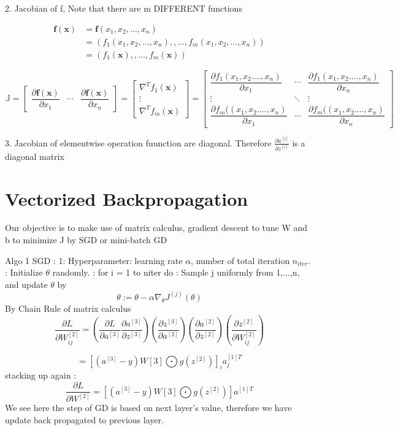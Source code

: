 \documentclass{article}
\begin{document}
2. Jacobian of f, Note that there are m DIFFERENT functions 

$$
\begin{aligned}
\mathbf{f}(\mathbf{x})&=\mathbf{f}(x_1,x_2,\dots,x_n)\\
&=(f_1(x_1,x_2,\dots,x_n),,\dots,f_m(x_1,x_2,\dots,x_n))\\
&=(f_1(\mathbf{x}),,\dots,f_m(\mathbf{x}))
\end{aligned}
$$

$$
\mathbb{J}=\left[\begin{array}{ccc}
\dfrac{\partial \mathbf{f}(\mathbf{x})}{\partial x_{1}} & \cdots & \dfrac{\partial \mathbf{f}(\mathbf{x})}{\partial x_{n}}
\end{array}\right]=\left[\begin{array}{c}
\nabla^{T} f_{1}(\mathbf{x}) \\
\vdots \\
\nabla^{T} f_{m}(\mathbf{x})
\end{array}\right]=\left[\begin{array}{ccc}
\dfrac{\partial f_{1}(x_1,x_2....,x_n)}{\partial x_{1}} & \cdots & \dfrac{\partial f_{1}(x_1,x_2....,x_n)}{\partial x_{n}} \\
\vdots & \ddots & \vdots \\
\dfrac{\partial f_{m}((x_1,x_2....,x_n)}{\partial x_{1}} & \cdots & \dfrac{\partial f_{m}((x_1,x_2....,x_n)}{\partial x_{n}}
\end{array}\right]
$$

3. Jacobian of elementwise operation fuunction are diagonal. Therefore  \( \frac{\partial a^{[i]} }{\partial z^{[i]}} \) is a diagonal matrix \newline

\section{Vectorized Backpropagation}
Our objective is to make use of matrix calculus, gradient descent to tune W and b to minimize J by SGD or mini-batch GD \newline

Algo 1 SGD : 
 1: Hyperparameter: learning rate \(\alpha\), number of total iteration \(n_{iter}\). : Initialize \(\theta\) randomly. : for i = 1 to niter do : Sample j uniformly from {1,...,n}, and update \(\theta\) by \newline
\[ \theta := \theta - \alpha \nabla_\theta J^{(j)}(\theta) \] 
By Chain Rule of matrix calculus 
\[
\frac{\partial L }{\partial W_{ij}^{[2]}} = ( \frac{\partial L }{\partial a^{[3]}} \frac{\partial a^{[3]}}{\partial z^{[3]}} )
(\frac{\partial z^{[3]}}{\partial a^{[2]}}) ( \frac{\partial a^{[2]}}{\partial z^{[2]}})( \frac{\partial z^{[2]}}{\partial W_{ij}^{[2]}})
\]

\[
= [ (a^{[3]}-y)W[3] \bigodot g(z^{[2]}) ]_i a_j^{[1]T} 
\]
stacking up again :
\[
\frac{\partial L }{\partial W^{[2]}} = [ (a^{[3]}-y)W[3] \bigodot g(z^{[2]}) ] a^{[1]T} 
\]
We see here the step of GD is based on next layer's value, therefore we have update back propagated to previous layer.
\end{document}
